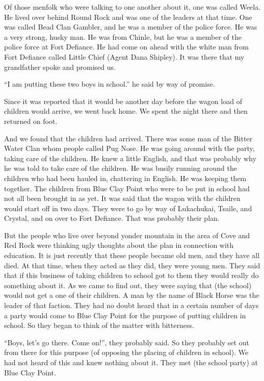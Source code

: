 Of those menfolk who were talking to one another about it, one was called Weela. He lived over behind Round Rock and was one of the leaders at that time. One was called Bead Clan Gambler, and he was a member of the police force. He was a very strong, husky man. He was from Chinle, but he was a member of the police force at Fort Defiance. He had come on ahead with the white man from Fort Defiance called Little Chief (Agent Dana Shipley). It was there that my grandfather spoke and promised us.

``I am putting these two boys in school.'' he said by way of promise.

Since it was reported that it would be another day before the wagon load of children would arrive, we went back home. We spent the night there and then returned on foot.

And we found that the children had arrived. There was some man of the Bitter Water Clan whom people called Pug Nose. He was going around with the party, taking care of the children. He knew a little English, and that was probably why he was told to take care of the children. He was busily running around the children who had been hauled in, chattering in English. He was keeping them together. The children from Blue Clay Point who were to be put in school had not all been brought in as yet. It was said that the wagon with the children would start off in two days. They were to go by way of Lukachukai, Tsaile, and Crystal, and on over to Fort Defiance. That was probably their plan.

But the people who live over beyond yonder mountain in the area of Cove and Red Rock were thinking ugly thoughts about the plan in connection with education. It is just recently that these people became old men, and they have all died. At that time, when they acted as they did, they were young men. They said that if this business of taking children to school got to them they would really do something about it. As we came to find out, they were saying that (the school) would not get a one of their children. A man by the name of Black Horse was the leader of that faction. They had no doubt heard that in a certain number of days a party would come to Blue Clay Point for the purpose of putting children in school. So they began to think of the matter with bitterness.

``Boys, let's go there. Come on!'', they probably said. So they probably set out from there for this purpose (of opposing the placing of children in school). We had not heard of this and knew nothing about it. They met (the school party) at Blue Clay Point. 

